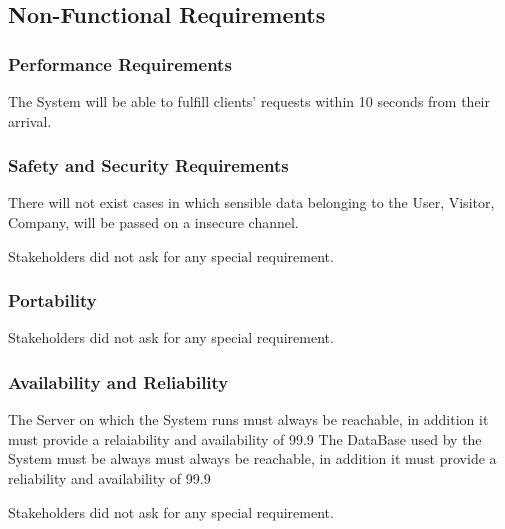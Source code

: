 \subsection{Non-Functional Requirements}

\subsubsection{Performance Requirements}
The System will be able to fulfill clients' requests within 10 seconds from their arrival.
\subsubsection{Safety and Security Requirements}
There will not exist cases in which sensible data belonging to the User, Visitor, Company, will be passed on a insecure channel.

Stakeholders did not ask for any special requirement.
\subsubsection{Portability}
Stakeholders did not ask for any special requirement.
\subsubsection{Availability and Reliability}
The Server on which the System runs must always be reachable, in addition it must provide a relaiability and availability of 99.9%
The DataBase used by the System must be always must always be reachable, in addition it must provide a reliability and availability of 99.9%

Stakeholders did not ask for any special requirement.
